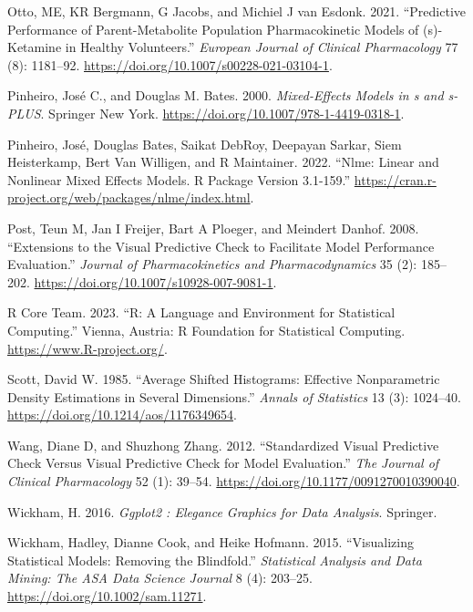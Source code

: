 \begin{CSLReferences}{1}{0}
\leavevmode{}%
Otto, ME, KR Bergmann, G Jacobs, and Michiel J van Esdonk. 2021. {``Predictive Performance of Parent-Metabolite Population Pharmacokinetic Models of (s)-Ketamine in Healthy Volunteers.''} \emph{European Journal of Clinical Pharmacology} 77 (8): 1181--92. \url{https://doi.org/10.1007/s00228-021-03104-1}.

\leavevmode{}%
Pinheiro, José C., and Douglas M. Bates. 2000. \emph{Mixed-Effects Models in s and s-{PLUS}}. Springer New York. \url{https://doi.org/10.1007/978-1-4419-0318-1}.

\leavevmode{}%
Pinheiro, José, Douglas Bates, Saikat DebRoy, Deepayan Sarkar, Siem Heisterkamp, Bert Van Willigen, and R Maintainer. 2022. {``Nlme: Linear and Nonlinear Mixed Effects Models. R Package Version 3.1-159.''} \url{https://cran.r-project.org/web/packages/nlme/index.html}.

\leavevmode{}%
Post, Teun M, Jan I Freijer, Bart A Ploeger, and Meindert Danhof. 2008. {``Extensions to the Visual Predictive Check to Facilitate Model Performance Evaluation.''} \emph{Journal of Pharmacokinetics and Pharmacodynamics} 35 (2): 185--202. \url{https://doi.org/10.1007/s10928-007-9081-1}.

\leavevmode{}%
R Core Team. 2023. {``R: A Language and Environment for Statistical Computing.''} Vienna, Austria: R Foundation for Statistical Computing. \url{https://www.R-project.org/}.

\leavevmode{}%
Scott, David W. 1985. {``Average Shifted Histograms: Effective Nonparametric Density Estimations in Several Dimensions.''} \emph{Annals of Statistics} 13 (3): 1024--40. \url{https://doi.org/10.1214/aos/1176349654}.

\leavevmode{}%
Wang, Diane D, and Shuzhong Zhang. 2012. {``Standardized Visual Predictive Check Versus Visual Predictive Check for Model Evaluation.''} \emph{The Journal of Clinical Pharmacology} 52 (1): 39--54. \url{https://doi.org/10.1177/0091270010390040}.

\leavevmode{}%
Wickham, H. 2016. \emph{Ggplot2 : Elegance Graphics for Data Analysis}. Springer.

\leavevmode{}%
Wickham, Hadley, Dianne Cook, and Heike Hofmann. 2015. {``Visualizing Statistical Models: Removing the Blindfold.''} \emph{Statistical Analysis and Data Mining: The ASA Data Science Journal} 8 (4): 203--25. \url{https://doi.org/10.1002/sam.11271}.

\end{CSLReferences}

